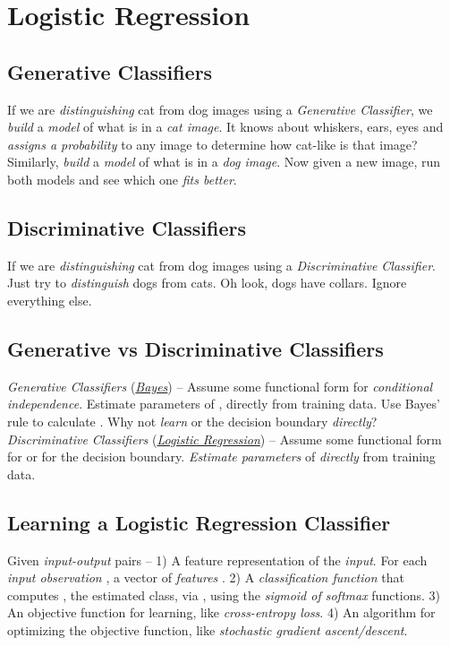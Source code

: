 \documentclass[
	exam={Midterm}
]{cs584exam}
\begin{document}
\chapter{Logistic Regression}\label{ch:logistic-regression}
\section{Generative Classifiers}\label{sec:generative-classifiers}
If we are \emph{distinguishing} cat from dog images using a \emph{Generative Classifier}, we \emph{build} a \emph{model} of what is in a \emph{cat image}.
It knows about whiskers, ears, eyes and \emph{assigns a probability} to any image to determine how cat-like is that image?
Similarly, \emph{build} a \emph{model} of what is in a \emph{dog image}.
Now given a new image, run both models and see which one \emph{fits better}.

\section{Discriminative Classifiers}\label{sec:discriminative-classifiers}
If we are \emph{distinguishing} cat from dog images using a \emph{Discriminative Classifier}.
Just try to \emph{distinguish} dogs from cats.
Oh look, dogs have collars.
Ignore everything else.

\section{Generative vs Discriminative Classifiers}\label{sec:generative-vs-discriminative-classifiers}
\emph{Generative Classifiers} (\hyperref[eq:mle]{\emph{\Naive Bayes}}) --
Assume some functional form for \emph{conditional independence}.
Estimate parameters of ,  directly from training data.
Use Bayes' rule to calculate .
Why not \emph{learn}  or the decision boundary \emph{directly}?
\emph{Discriminative Classifiers} (\hyperref[eq:map]{\emph{Logistic Regression}}) --
Assume some functional form for  or for the decision boundary.
\emph{Estimate parameters} of  \emph{directly} from training data.

\section{Learning a Logistic Regression Classifier}\label{sec:learning-a-logisitc-regression-classifier}
Given  \emph{input-output} pairs --
1) A feature representation of the \emph{input}.
For each \emph{input observation} , a vector of \emph{features} \data{$[x_{1}, x_{2}, \dots, x_{d}]$}.
2) A \emph{classification function} that computes , the estimated class, via , using the \emph{sigmoid of softmax} functions.
3) An objective function for learning, like \emph{cross-entropy loss}.
4) An algorithm for optimizing the objective function, like \emph{stochastic gradient ascent/descent}.
\end{document}
